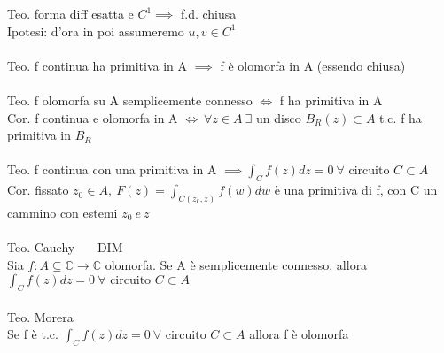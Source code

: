 \documentclass{article}
\theoremstyle{unnumbered}
\theoremstyle{unnumbered1}
\begin{document}
%
Teo. forma diff esatta e $C^1 \implies$ f.d. chiusa \\
Ipotesi: d'ora in poi assumeremo $u,v\in C^1$\\ \\
%
Teo. f continua ha primitiva in A $\implies$ f è olomorfa in A (essendo chiusa)\\ \\
%
Teo. f olomorfa su A semplicemente connesso $\Longleftrightarrow$ f ha primitiva in A\\
%
Cor. f continua e olomorfa in A $\Longleftrightarrow \ \forall z \in A \ \exists$ un disco $B_R(z)\subset A$ t.c. f ha primitiva in $B_R$ \\ \\
%
Teo. f continua con una primitiva in A $\implies \int_{C}f(z)dz=0 \ \forall \text{ circuito }C\subset A$\\
%
Cor. fissato $z_0\in A, \ F(z)=\int_{C(z_0,z)}f(w)dw$ è una primitiva di f, con C un cammino con estemi $z_0 \ e \ z$ \\ \\
%
Teo. Cauchy \ \ \ DIM\\
Sia $f:A\subseteq\mathbb{C}\rightarrow\mathbb{C}$ olomorfa. Se A è semplicemente connesso, allora $\int_{C}f(z)dz=0 \ \forall \text{ circuito }C\subset A$\\ \\
%
Teo. Morera\\
Se f è t.c. $\int_{C}f(z)dz=0 \ \forall \text{ circuito }C\subset A$ allora f è olomorfa \\
\end{document}
